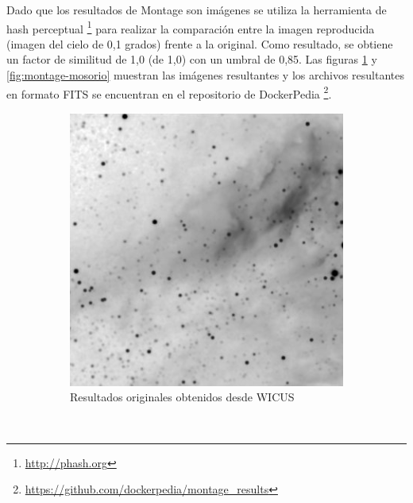 Dado que los resultados de Montage son imágenes se utiliza la herramienta de hash perceptual \footnote{\url{http://phash.org}} para realizar la comparación entre la imagen reproducida (imagen del cielo de 0,1 grados) frente a la original.
Como resultado, se obtiene un factor de similitud de 1,0 (de 1,0) con un umbral de 0,85.
Las figuras \ref{fig:montage-wicus} y \ref{fig:montage-mosorio} muestran las imágenes resultantes y los archivos resultantes en formato FITS se encuentran en el repositorio de DockerPedia \footnote{\url{https://github.com/dockerpedia/montage_results}}. 

\begin{figure}[t]
    \centering
    \begin{subfigure}[b]{0.4\textwidth}
         \centering
         \includegraphics[width=\textwidth]{Figures/montage-original}
         \caption[Resultados workflow original: Montage]{Resultados originales obtenidos desde WICUS}
         \label{fig:montage-wicus}
     \end{subfigure}
         ~ 
	    \begin{subfigure}[b]{0.4\textwidth}
         \centering

\end{subfigure}
\end{figure}
